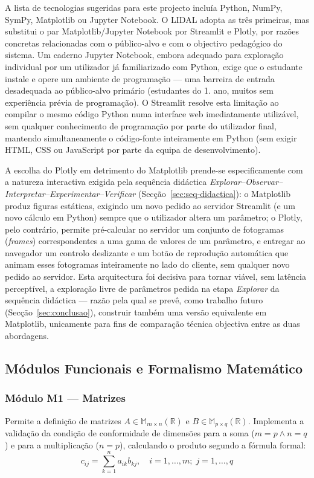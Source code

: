 \documentclass[conference]{IEEEtran}
\begin{document}
A lista de tecnologias sugeridas para este projecto incluía Python, NumPy, SymPy, Matplotlib ou Jupyter Notebook. O LIDAL adopta as três primeiras, mas substitui o par Matplotlib/Jupyter Notebook por Streamlit e Plotly, por razões concretas relacionadas com o público-alvo e com o objectivo pedagógico do sistema. Um caderno Jupyter Notebook, embora adequado para exploração individual por um utilizador já familiarizado com Python, exige que o estudante instale e opere um ambiente de programação --- uma barreira de entrada desadequada ao público-alvo primário (estudantes do 1.\textordmasculine{} ano, muitos sem experiência prévia de programação). O Streamlit resolve esta limitação ao compilar o mesmo código Python numa interface web imediatamente utilizável, sem qualquer conhecimento de programação por parte do utilizador final, mantendo simultaneamente o código-fonte inteiramente em Python (sem exigir HTML, CSS ou JavaScript por parte da equipa de desenvolvimento).

A escolha do Plotly em detrimento do Matplotlib prende-se especificamente com a natureza interactiva exigida pela sequência didáctica \textit{Explorar--Observar--Interpretar--Experimentar--Verificar} (Secção~\ref{sec:seq-didactica}): o Matplotlib produz figuras estáticas, exigindo um novo pedido ao servidor Streamlit (e um novo cálculo em Python) sempre que o utilizador altera um parâmetro; o Plotly, pelo contrário, permite pré-calcular no servidor um conjunto de fotogramas (\textit{frames}) correspondentes a uma gama de valores de um parâmetro, e entregar ao navegador um controlo deslizante e um botão de reprodução automática que animam esses fotogramas inteiramente no lado do cliente, sem qualquer novo pedido ao servidor. Esta arquitectura foi decisiva para tornar viável, sem latência perceptível, a exploração livre de parâmetros pedida na etapa \textit{Explorar} da sequência didáctica --- razão pela qual se prevê, como trabalho futuro (Secção~\ref{sec:conclusao}), construir também uma versão equivalente em Matplotlib, unicamente para fins de comparação técnica objectiva entre as duas abordagens.

\subsection{Módulos Funcionais e Formalismo Matemático}

\subsubsection{Módulo M1 --- Matrizes}
Permite a definição de matrizes $A \in \mathbb{M}_{m \times n}(\mathbb{R})$ e $B \in \mathbb{M}_{p \times q}(\mathbb{R})$. Implementa a validação da condição de conformidade de dimensões para a soma ($m=p \wedge n=q$) e para a multiplicação ($n=p$), calculando o produto segundo a fórmula formal:
\begin{equation}
c_{ij} = \sum_{k=1}^{n} a_{ik}b_{kj}, \quad i = 1,\dots,m;\; j = 1,\dots,q
\label{eq:produto}
\end{equation}
\end{document}
